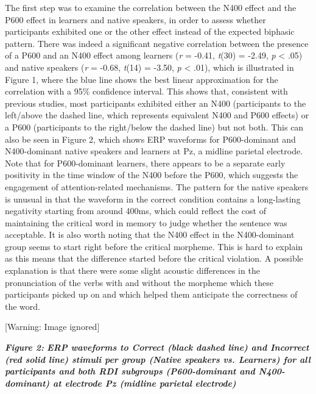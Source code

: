 \documentclass[11pt]{article}
\newenvironment{styleStandard}{\renewcommand\baselinestretch{1.0}\setlength\leftskip{0cm}\setlength\rightskip{0cm plus 1fil}\setlength\parindent{0cm}\setlength\parfillskip{0pt plus 1fil}\setlength\parskip{0in plus 1pt}\writerlistparindent\writerlistleftskip\leavevmode\normalfont\normalsize\writerlistlabel\ignorespaces}{\unskip\vspace{0.111in plus 0.0111in}\par}
\newenvironment{stylecaption}{\renewcommand\baselinestretch{1.0}\setlength\leftskip{0cm}\setlength\rightskip{0cm plus 1fil}\setlength\parindent{0cm}\setlength\parfillskip{0pt plus 1fil}\setlength\parskip{0in plus 1pt}\writerlistparindent\writerlistleftskip\leavevmode\normalfont\normalsize\fontsize{9pt}{10.8pt}\selectfont\itshape\writerlistlabel\ignorespaces}{\unskip\vspace{0.139in plus 0.0139in}\par}
\newcommand\writerlistleftskip{}
\newcommand\writerlistparindent{}
\newcommand\writerlistlabel{}
\begin{document}
\begin{styleStandard}
The first step was to examine the correlation between the N400 effect and the P600 effect in learners and native speakers, in order to assess whether participants exhibited one or the other effect instead of the expected biphasic pattern. There was indeed a significant negative correlation between the presence of a P600 and an N400 effect among learners (\textit{r }= -0.41, \textit{t}(30) = -2.49, \textit{p }{\textless} .05) and native speakers (\textit{r }= -0.68, \textit{t}(14) = -3.50, \textit{p }{\textless} .01), which is illustrated in Figure 1, where the blue line shows the best linear approximation for the correlation with a 95\% confidence interval. This shows that, consistent with previous studies, most participants exhibited either an N400 (participants to the left/above the dashed line, which represents equivalent N400 and P600 effects) or a P600 (participants to the right/below the dashed line) but not both. This can also be seen in Figure 2, which shows ERP waveforms for P600-dominant and N400-dominant native speakers and learners at Pz, a midline parietal electrode. Note that for P600-dominant learners, there appears to be a separate early positivity in the time window of the N400 before the P600, which suggests the engagement of attention-related mechanisms. The pattern for the native speakers is unusual in that the waveform in the correct condition contains a long-lasting negativity starting from around 400ms, which could reflect the cost of maintaining the critical word in memory to judge whether the sentence was acceptable. It is also worth noting that the N400 effect in the N400-dominant group seems to start right before the critical morpheme. This is hard to explain as this means that the difference started before the critical violation. A possible explanation is that there were some slight acoustic differences in the pronunciation of the verbs with and without the morpheme which these participants picked up on and which helped them anticipate the correctness of the word. 
\end{styleStandard}

\begin{center}
 [Warning: Image ignored] %

\end{center}
\begin{stylecaption}
\textbf{\textup{Figure 2:}}\textbf{ }\textbf{\textup{ERP waveforms to Correct (black dashed line) and Incorrect (red solid line) stimuli per group (Native speakers vs. Learners) for all participants and both RDI subgroups (P600-dominant and N400-dominant) at electrode Pz (midline parietal electrode)}}
\end{stylecaption}
\end{document}
